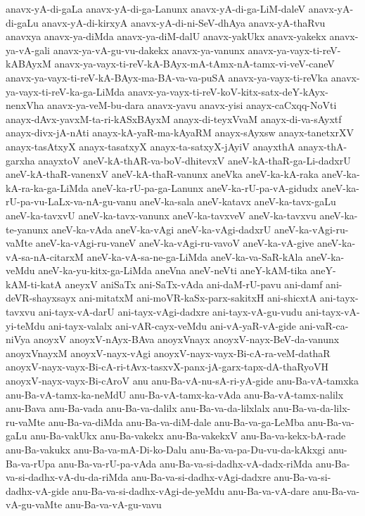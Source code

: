 {anavx-yA-di-gaLa
anavx-yA-di-ga-Lanunx
anavx-yA-di-ga-LiM-daleV
anavx-yA-di-gaLu
anavx-yA-di-kirxyA
anavx-yA-di-ni-SeV-dhAya
anavx-yA-thaRvu
anavxya
anavx-ya-diMda
anavx-ya-diM-dalU
anavx-yakUkx
anavx-yakekx
anavx-ya-vA-gali
anavx-ya-vA-gu-vu-dakekx
anavx-ya-vanunx
anavx-ya-vayx-ti-reV-kABAyxM
anavx-ya-vayx-ti-reV-kA-BAyx-mA-tAmx-nA-tamx-vi-veV-caneV
anavx-ya-vayx-ti-reV-kA-BAyx-ma-BA-va-va-puSA
anavx-ya-vayx-ti-reVka
anavx-ya-vayx-ti-reV-ka-ga-LiMda
anavx-ya-vayx-ti-reV-koV-kitx-satx-deY-kAyx-nenxVha
anavx-ya-veM-bu-dara
anavx-yavu
anavx-yisi
anayx-caCxqq-NoVti
anayx-dAvx-yavxM-ta-ri-kASxBAyxM
anayx-di-teyxVvaM
anayx-di-va-sAyxtf
anayx-divx-jA-nAti
anayx-kA-yaR-ma-kAyaRM
anayx-sAyxsw
anayx-tanetxrXV
anayx-tasAtxyX
anayx-tasatxyX
anayx-ta-satxyX-jAyiV
anayxthA
anayx-thA-garxha
anayxtoV
aneV-kA-thAR-va-boV-dhitevxV
aneV-kA-thaR-ga-Li-dadxrU
aneV-kA-thaR-vanenxV
aneV-kA-thaR-vanunx
aneVka
aneV-ka-kA-raka
aneV-ka-kA-ra-ka-ga-LiMda
aneV-ka-rU-pa-ga-Lanunx
aneV-ka-rU-pa-vA-gidudx
aneV-ka-rU-pa-vu-LaLx-va-nA-gu-vanu
aneV-ka-sala
aneV-katavx
aneV-ka-tavx-gaLu
aneV-ka-tavxvU
aneV-ka-tavx-vanunx
aneV-ka-tavxveV
aneV-ka-tavxvu
aneV-ka-te-yanunx
aneV-ka-vAda
aneV-ka-vAgi
aneV-ka-vAgi-dadxrU
aneV-ka-vAgi-ru-vaMte
aneV-ka-vAgi-ru-vaneV
aneV-ka-vAgi-ru-vavoV
aneV-ka-vA-give
aneV-ka-vA-sa-nA-citarxM
aneV-ka-vA-sa-ne-ga-LiMda
aneV-ka-va-SaR-kAla
aneV-ka-veMdu
aneV-ka-yu-kitx-ga-LiMda
aneVna
aneV-neVti
aneY-kAM-tika
aneY-kAM-ti-katA
aneyxV
aniSaTx
ani-SaTx-vAda
ani-daM-rU-pavu
ani-damf
ani-deVR-shayxsayx
ani-mitatxM
ani-moVR-kaSx-parx-sakitxH
ani-shicxtA
ani-tayx-tavxvu
ani-tayx-vA-darU
ani-tayx-vAgi-dadxre
ani-tayx-vA-gu-vudu
ani-tayx-vA-yi-teMdu
ani-tayx-valalx
ani-vAR-cayx-veMdu
ani-vA-yaR-vA-gide
ani-vaR-ca-niVya
anoyxV
anoyxV-nAyx-BAva
anoyxVnayx
anoyxV-nayx-BeV-da-vanunx
anoyxVnayxM
anoyxV-nayx-vAgi
anoyxV-nayx-vayx-Bi-cA-ra-veM-dathaR
anoyxV-nayx-vayx-Bi-cA-ri-tAvx-tasxvX-panx-jA-garx-tapx-dA-thaRyoVH
anoyxV-nayx-vayx-Bi-cAroV
anu
anu-Ba-vA-nu-sA-ri-yA-gide
anu-Ba-vA-tamxka
anu-Ba-vA-tamx-ka-neMdU
anu-Ba-vA-tamx-ka-vAda
anu-Ba-vA-tamx-nalilx
anu-Bava
anu-Ba-vada
anu-Ba-va-dalilx
anu-Ba-va-da-lilxlalx
anu-Ba-va-da-lilx-ru-vaMte
anu-Ba-va-diMda
anu-Ba-va-diM-dale
anu-Ba-va-ga-LeMba
anu-Ba-va-gaLu
anu-Ba-vakUkx
anu-Ba-vakekx
anu-Ba-vakekxV
anu-Ba-va-kekx-bA-rade
anu-Ba-vakukx
anu-Ba-va-mA-Di-ko-Dalu
anu-Ba-va-pa-Du-vu-da-kAkxgi
anu-Ba-va-rUpa
anu-Ba-va-rU-pa-vAda
anu-Ba-va-si-dadhx-vA-dadx-riMda
anu-Ba-va-si-dadhx-vA-du-da-riMda
anu-Ba-va-si-dadhx-vAgi-dadxre
anu-Ba-va-si-dadhx-vA-gide
anu-Ba-va-si-dadhx-vAgi-de-yeMdu
anu-Ba-va-vA-dare
anu-Ba-va-vA-gu-vaMte
anu-Ba-va-vA-gu-vavu
}
